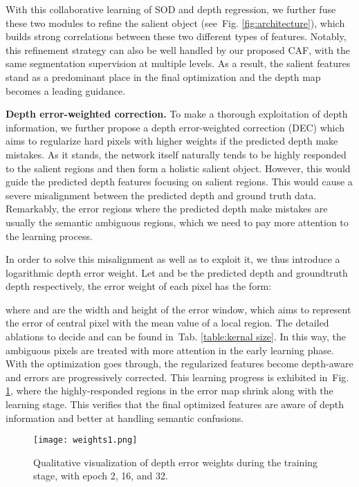 \documentclass[sigconf]{acmart}
\newcommand{\figref}[1]{Fig. \ref{#1}}
\newcommand{\tabref}[1]{Tab. \ref{#1}}
\begin{document}
With this collaborative learning of SOD and depth regression, we further fuse these two modules to refine the salient object (see~\figref{fig:architecture}), which builds strong correlations between these two different types of features. Notably, this refinement strategy can also be well handled by our proposed CAF, with the same segmentation supervision at multiple levels. As a result, the salient features stand as a predominant place in the final optimization and the depth map becomes a leading guidance.  
 
\textbf{Depth error-weighted correction.}
To make a thorough exploitation of depth information, we further propose a depth error-weighted correction (DEC) which aims to regularize hard pixels with higher weights if the predicted depth make mistakes. As it stands, the network itself naturally tends to be highly responded to the salient regions and then form a holistic salient object. However, this would guide the predicted depth features focusing on salient regions. This would cause a severe misalignment between the predicted depth and ground truth data. Remarkably, the error regions where the predicted depth make mistakes are usually the semantic ambiguous regions, which we need to pay more attention to the learning process.

In order to solve this misalignment as well as to exploit it, we thus introduce a logarithmic depth error weight. Let  and  be the predicted depth and groundtruth depth respectively, the error weight  of each pixel has the form:

where  and  are the width and height of the error window, which aims to represent the error of central pixel with the mean value of a local region. The detailed ablations to decide  and  can be found in~\tabref{table:kernal size}.
In this way, the ambiguous pixels are treated with more attention in the early learning phase. With the optimization goes through, the regularized features become depth-aware and errors are progressively corrected. This learning progress is exhibited in~\figref{fig:weights}, where the highly-responded regions in the error map shrink along with the learning stage. This verifies that the final optimized features are aware of depth information and better at handling semantic confusions.

 \begin{figure}[H]
 	\begin{center}
\texttt{[image: weights1.png]}
 		\caption{Qualitative visualization of depth error weights during the training stage, with epoch 2, 16, and 32.
 		}\label{fig:weights}
 	\end{center}
 	
 \end{figure}
\end{document}
